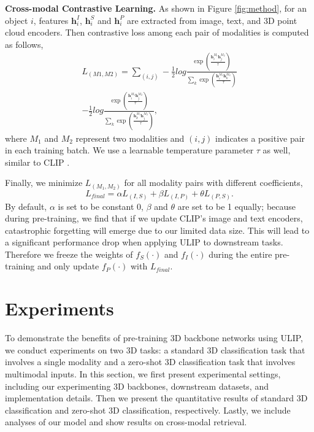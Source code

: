 \noindent\textbf{Cross-modal Contrastive Learning.}
As shown in Figure \ref{fig:method}, for an object $i$, features $\mathbf{h}^I_i$, $\mathbf{h}^S_i$ and $\mathbf{h}^P_i$ are extracted from image, text, and 3D point cloud encoders. Then contrastive loss among each pair of modalities is computed as follows, 
\begin{equation}
\begin{aligned}
 L_{(M1, M2)} =
   \sum_{(i,j)}-\frac{1}{2}log\frac{\exp\left(\frac{\mathbf{h}^{M_1}_i \mathbf{h}^{M_2}_j}{\tau}\right)}{\sum_k \exp\left(\frac{\mathbf{h}^{M_1}_i \mathbf{h}^{M_2}_k}{\tau}\right)} \\-\frac{1}{2}
    log\frac{\exp\left(\frac{\mathbf{h}^{M_1}_i \mathbf{h}^{M_2}_j}{\tau}\right)}{\sum_k \exp\left(\frac{\mathbf{h}^{M_1}_k \mathbf{h}^{M_2}_j}{\tau}\right)},
\end{aligned}
\end{equation}
where $M_1$ and $M_2$ represent two modalities and $(i, j)$ indicates a positive pair in each training batch. We use a learnable temperature parameter $\tau$ as well, similar to CLIP \cite{radford2021learning}.

Finally, we minimize $ L_{(M_1, M_2)}$ for all modality pairs with different coefficients, 
\begin{equation}
 \label{eq:final loss}
   L_{final} = \alpha L_{(I,S)}+ \beta L_{(I,P)} + \theta L_{(P,S)}.
\end{equation}
By default, $\alpha$ is set to be constant 0, $\beta$ and $\theta$ are set to be 1 equally; because during pre-training, we find that if we update CLIP's image and text encoders, catastrophic forgetting will emerge due to our limited data size. This will lead to a significant performance drop when applying ULIP to downstream tasks. Therefore we freeze the weights of $f_S(\cdot)$ and $f_I(\cdot)$ during the entire pre-training and only update $f_P(\cdot)$ with $L_{final}$.

\section{Experiments}
\label{sec:experiments}
To demonstrate the benefits of pre-training 3D backbone networks using ULIP, we conduct experiments on two 3D tasks: a standard 3D classification task that involves a single modality and a zero-shot 3D classification task that involves multimodal inputs.
In this section, we first present experimental settings, including our experimenting 3D backbones, downstream datasets, and implementation details.
Then we present the quantitative results of standard 3D classification and zero-shot 3D classification, respectively. Lastly, we include analyses of our model and show results on cross-modal retrieval.

